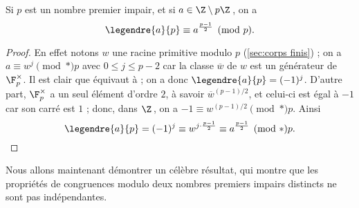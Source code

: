 \documentclass[11pt, useosf,
  title in boldface,
  theorem in new line,
  theorem numbering = section,
  number theorems separately,
]{simplivre}
\begin{document}
    \begin{proposition}\label{prop:critère d'Euler}
        Si \( p \) est un nombre premier impair, et si \( a \in \Z \setminus p\Z \)\,, on a
        \[
            \legendre{a}{p} \equiv a^{\frac{p-1}{2}} \pmod{p}.
        \]
        \vspace{-\baselineskip}
    \end{proposition}
\enlargethispage*{\baselineskip}
    \begin{proof}
        En effet notons \( w \) une racine primitive modulo \( p \) (\cref{sec:corps finis}) ; on a \( a \equiv w^j \pmod*{p} \) avec \( 0 \leqslant j \leqslant p-2 \) car la classe \( \overline{w} \) de \( w \) est un générateur de \( \F_p^\times \). Il est clair que  équivaut à  ; on a donc \( \legendre{a}{p} = (-1)^j \). D'autre part, \( \F_p^\times \) a un seul élément d'ordre \( 2 \), à savoir \( \overline{w}^{(p-1)/2} \), et celui-ci est égal à \( -1 \) car son carré est \( 1 \) ; donc, dans \( \Z \)\,, on a \( -1 \equiv w^{(p-1)/2} \pmod*{p} \). Ainsi
        \vspace{-.3\baselineskip}
        \[
            \legendre{a}{p} = (-1)^j \equiv w^{j\cdot\frac{p-1}{2}} \equiv a^{\frac{p-1}{2}} \pmod*{p}.
            \qedhere
        \]
    \end{proof}

    Nous allons maintenant démontrer un célèbre résultat, qui montre que les propriétés de congruences modulo deux nombres premiers impairs distincts ne sont pas indépendantes.
\end{document}
